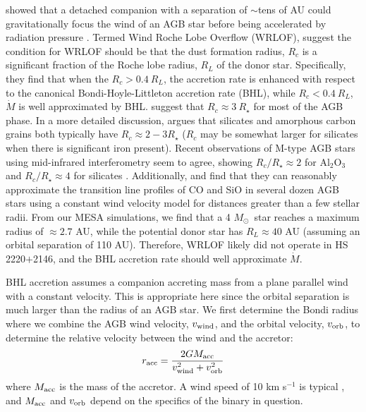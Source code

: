 \documentclass{emulateapj}
\newcommand{\Msun}{\ifmmode {M_{\odot}}\else${M_{\odot}}$\fi}
\begin{document}
\citet{mohamed07} showed that a detached companion with a separation of $\sim$tens of AU could gravitationally focus the wind of an AGB star before being accelerated by radiation pressure \citep[see also][]{mohamed12}. Termed Wind Roche Lobe Overflow (WRLOF), \citet{abate13} suggest the condition for WRLOF should be that the dust formation radius, $R_c$ is a significant fraction of the Roche lobe radius, $R_L$ of the donor star. Specifically, they find that when the $R_c > 0.4~ R_L$, the accretion rate is enhanced with respect to the canonical Bondi-Hoyle-Littleton accretion rate (BHL), while $R_c < 0.4~ R_L$, $\dot{M}$ is well approximated by BHL. \citet{abate13} suggest that $R_c \approx 3~ R_{\star}$ for most of the AGB phase. In a more detailed discussion, \citet{hofner09} argues that silicates and amorphous carbon grains both typically have $R_c \approx 2-3 R_{\star}$ ($R_c$ may be somewhat larger for silicates when there is significant iron present). Recent observations of M-type AGB stars using mid-infrared interferometry seem to agree, showing $R_c/R_{\star} \approx 2$ for Al$_2$O$_3$ and $R_c/R_{\star} \approx 4$ for silicates \citep{karovicova13}. Additionally, \citet{olofsson02} and \citet{gonzalez_delgado03} find that they can reasonably approximate the transition line profiles of CO and SiO in several dozen AGB stars using a constant wind velocity model for distances greater than a few stellar radii. From our MESA simulations, we find that a 4 \Msun\ star reaches a maximum radius of $\approx 2.7$ AU, while the potential donor star has $R_L \approx 40$ AU (assuming an orbital separation of 110 AU). Therefore, WRLOF likely did not operate in HS 2220$+$2146, and the BHL accretion rate should well approximate $\dot{M}$.


BHL accretion assumes a companion accreting mass from a plane parallel wind with a constant velocity. This is appropriate here since the orbital separation is much larger than the radius of an AGB star. We first determine the Bondi radius where we combine the AGB wind velocity, $v_{\rm wind}$, and the orbital velocity, $v_{\rm orb}$, to determine the relative velocity between the wind and the accretor:
\begin{equation}
r_{\rm acc} = \frac{2 G M_{\rm acc}}{v_{\rm wind}^2 + v_{\rm orb}^2} \label{eq:r_bondi} 
\end{equation}
where $M_{\rm acc}$ is the mass of the accretor. A wind speed of 10 km s$^{-1}$ is typical \citep{gonzalez_delgado03}, and $M_{\rm acc}$ and $v_{\rm orb}$ depend on the specifics of the binary in question.
\end{document}

